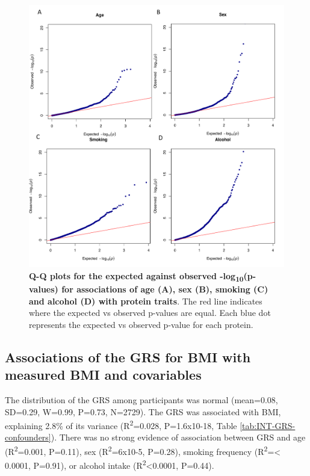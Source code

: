\documentclass[11pt,twoside]{bristolthesis}
\begin{document}
\begin{figure}

{\centering \includegraphics[width=0.95\linewidth]{figure/BMI_protein_INTERVAL/QQ_confounder_proteins} 

}

\caption[Q-Q plots of the expected against observed -log\textsubscript{10}(p-values) for the associations between covariables and protein traits]{\textbf{Q-Q plots for the expected against observed -log\textsubscript{10}(p-values) for associations of age (A), sex (B), smoking (C) and alcohol (D) with protein traits}. The red line indicates where the expected vs observed p-values are equal. Each blue dot represents the expected vs observed p-value for each protein.}\label{fig:QQ-confounder-proteins}
\end{figure}
\hypertarget{associations-of-the-grs-for-bmi-with-measured-bmi-and-covariables}{%
\subsection{Associations of the GRS for BMI with measured BMI and covariables}\label{associations-of-the-grs-for-bmi-with-measured-bmi-and-covariables}}

The distribution of the GRS among participants was normal (mean=0.08, SD=0.29, W=0.99, P=0.73, N=2729). The GRS was associated with BMI, explaining 2.8\% of its variance (R\textsuperscript{2}=0.028, P=1.6x10-18, Table \ref{tab:INT-GRS-confounders}). There was no strong evidence of association between GRS and age (R\textsuperscript{2}=0.001, P=0.11), sex (R\textsuperscript{2}=6x10-5, P=0.28), smoking frequency (R\textsuperscript{2}=\textless{} 0.0001, P=0.91), or alcohol intake (R\textsuperscript{2}\textless0.0001, P=0.44).
\end{document}
